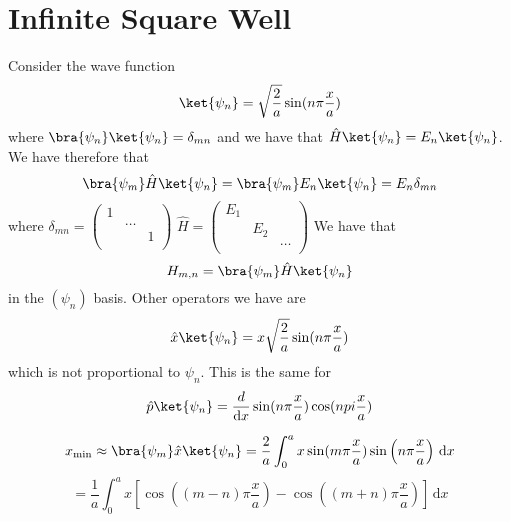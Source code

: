\section{Infinite Square Well}
Consider the wave function
\[
    \ket{\psi _n} = \sqrt{\frac{2}{a}} \sin (n \pi \frac{x}{a}) 
\]
where \(\bra{\psi _n} \ket{\psi_n} = \delta_{mn} \) and we have that 
\(\hat{H} \ket{\psi _n} =E_n \ket{\psi _n}\). We have therefore that 
\[
    \bra{\psi _m} \hat{H} \ket{\psi _n} = \bra{\psi _m} E_n \ket{\psi _n} = E_n \delta_{mn} 
\]
where \(\delta_{mn} = \begin{pmatrix}
    1 &  &   \\
     & \dots  &   \\
     &  &  1 \\
\end{pmatrix} \) 
\(\hat{H}  = \begin{pmatrix}
    E_1 &  &   \\
     & E_2 &   \\
     &  & \dots   \\
\end{pmatrix}\) 
We have that 
\[
    H_{m,n} = \bra{\psi _m} \hat{H} \ket{\psi _n}
\]
in the \( (\psi _n) \) basis. Other operators we have are
\[
    \hat{x} \ket{\psi _n} = x \sqrt{\frac{2}{a}} \sin (n \pi \frac{x}{a}) 
\] which is not proportional to \(\psi _n\). This is the same for
\[
    \hat{p} \ket{\psi _n} = \frac{d}{\mathrm{d}x } \sin (n \pi  \frac{x}{a}) \cos (npi \frac{x}{a})
\]

\[
    x_{\min } \approx \bra{\psi _m} \hat{x} \ket{\psi _n} = 
    \frac{2}{a} \int_{0}^{a} x \sin (m \pi  \frac{x}{a}) \sin \left( n \pi \frac{x}{a} \right)  \,\mathrm{d}x  
\]
\[
    = \frac{1}{a} \int_{0}^{a} x \left[ \cos \left( (m-n)\pi \frac{x}{a} \right)  - \cos \left( (m+n)\pi \frac{x}{a} \right) \right]  \,\mathrm{d}x 
\]